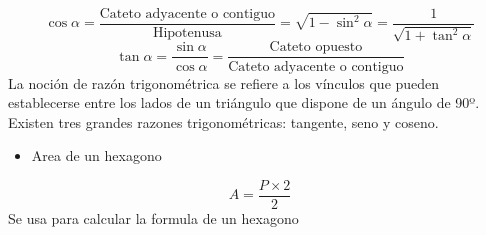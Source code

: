 \documentclass[4apaper, 12pt]{article}
\begin{document}
        \begin{equation*}
        \cos \alpha=\dfrac{\text{Cateto
        adyacente o contiguo}}
        {\text{Hipotenusa}}=
        \sqrt{1-\sin^2\alpha}=\dfrac {1}
        {\sqrt{1+\tan^2\alpha}}
        \end{equation*}
        \begin{equation*}
        \tan \alpha=\dfrac {\sin \alpha}
        {\cos \alpha}=\dfrac
        {\text{Cateto opuesto}}
        {\text{Cateto adyacente o
        contiguo}}
        \end{equation*}
        La noción de razón trigonométrica se refiere a los vínculos que pueden establecerse entre los lados de un triángulo que dispone de un ángulo de 90º. Existen tres grandes razones trigonométricas: tangente, seno y coseno.
        \begin{itemize}
            \item [\heartsuit]{Area de un hexagono}
        \end{itemize}
        \begin{equation}
            A= \frac{P\times{2}}{2}
        \end{equation}
        Se usa para calcular la formula de un hexagono 
\end{document}
